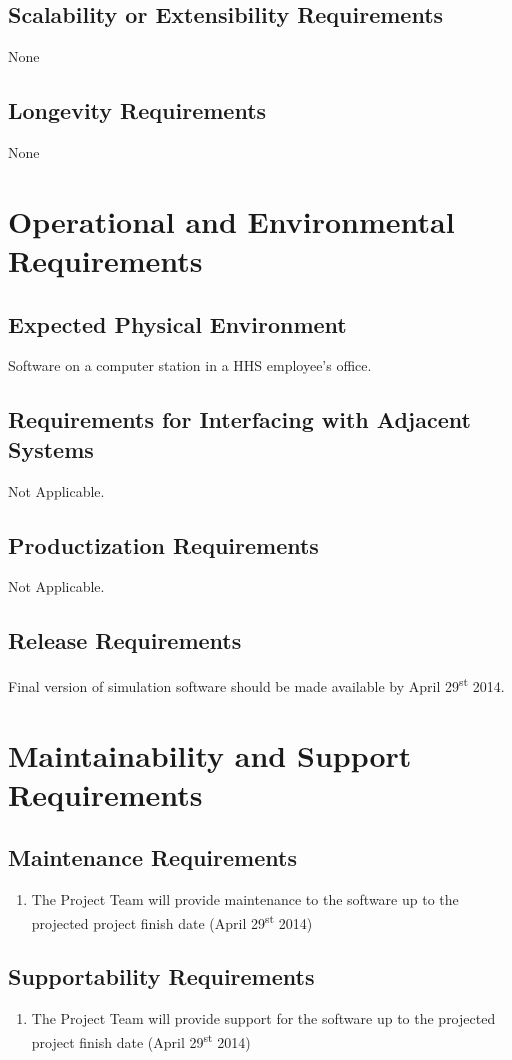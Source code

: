 \documentclass[paper=letter, fontsize=10pt]{scrartcl}
\numberwithin{equation}{section}		%
\numberwithin{figure}{section}			%
\numberwithin{table}{section}				%
\newcommand{\ts}{\textsuperscript}
\begin{document}
\subsection{Scalability or Extensibility Requirements}
None
\subsection{Longevity Requirements}
None

\section{Operational and Environmental Requirements}
\subsection{Expected Physical Environment}
Software on a computer station in a HHS employee's office.
\subsection{Requirements for Interfacing with Adjacent Systems}
Not Applicable.
\subsection{Productization Requirements}
Not Applicable.
\subsection{Release Requirements}
Final version of simulation software should be made available by April 29\ts{st} 2014.

\section{Maintainability and Support Requirements}
\subsection{Maintenance Requirements}
	\begin{enumerate}
		\item The Project Team will provide maintenance to the software up to the projected project finish date (April 29\ts{st} 2014)
	\end{enumerate}
\subsection{Supportability Requirements}
	\begin{enumerate}
		\item The Project Team will provide support for the software up to the projected project finish date (April 29\ts{st} 2014)
	\end{enumerate}
\end{document}
